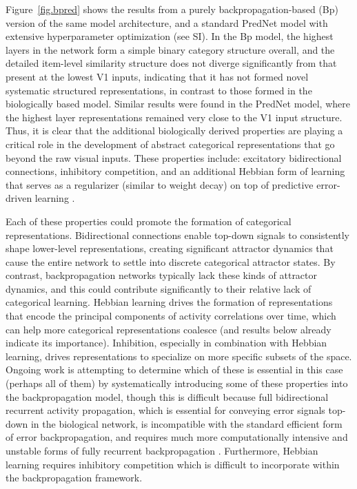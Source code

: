 \documentclass[12pt,twoside,lineno]{pnas-new}  %
\begin{document}
Figure~\ref{fig.bpred} shows the results from a purely backpropagation-based (Bp) version of the same model architecture, and a standard PredNet model \cite{LotterKreimanCox16} with extensive hyperparameter optimization (see SI).  In the Bp model, the highest layers in the network form a simple binary category structure overall, and the detailed item-level similarity structure does not diverge significantly from that present at the lowest V1 inputs, indicating that it has not formed novel systematic structured representations, in contrast to those formed in the biologically based model.  Similar results were found in the PredNet model, where the highest layer representations remained very close to the V1 input structure.  Thus, it is clear that the additional biologically derived properties are playing a critical role in the development of abstract categorical representations that go beyond the raw visual inputs. These properties include: excitatory bidirectional connections, inhibitory competition, and an additional Hebbian form of learning that serves as a regularizer (similar to weight decay) on top of predictive error-driven learning \cite{OReilly98,OReillyMunakata00}.

Each of these properties could promote the formation of categorical representations. Bidirectional connections enable top-down signals to consistently shape lower-level representations, creating significant attractor dynamics that cause the entire network to settle into discrete categorical attractor states. By contrast, backpropagation networks typically lack these kinds of attractor dynamics, and this could contribute significantly to their relative lack of categorical learning.  Hebbian learning drives the formation of representations that encode the principal components of activity correlations over time, which can help more categorical representations coalesce (and results below already indicate its importance).  Inhibition, especially in combination with Hebbian learning, drives representations to specialize on more specific subsets of the space.  Ongoing work is attempting to determine which of these is essential in this case (perhaps all of them) by systematically introducing some of these properties into the backpropagation model, though this is difficult because full bidirectional recurrent activity propagation, which is essential for conveying error signals top-down in the biological network, is incompatible with the standard efficient form of error backpropagation, and requires much more computationally intensive and unstable forms of fully recurrent backpropagation \cite{WilliamsZipser92,Pineda87}.  Furthermore, Hebbian learning requires inhibitory competition which is difficult to incorporate within the backpropagation framework.
\end{document}
